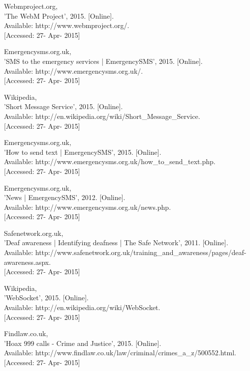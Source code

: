 \documentclass[]{article}
\begin{document}
\begin{enumerate}[label={[\arabic*]}]
\item  Webmproject.org, \\{}'The WebM Project', 2015. [Online]. \\{}Available: http://www.webmproject.org/.\\{} [Accessed: 27- Apr- 2015]

\item  Emergencysms.org.uk, \\{}'SMS to the emergency services | EmergencySMS', 2015. [Online].\\{} Available: http://www.emergencysms.org.uk/. \\{}[Accessed: 27- Apr- 2015]

\item  Wikipedia, \\{}'Short Message Service', 2015. [Online]. \\{}Available: http://en.wikipedia.org/wiki/Short\_Message\_Service. \\{}[Accessed: 27- Apr- 2015]

\item  Emergencysms.org.uk, \\{}'How to send text | EmergencySMS', 2015. [Online].\\{} Available: http://www.emergencysms.org.uk/how\_to\_send\_text.php. \\{}[Accessed: 27- Apr- 2015]

\item  Emergencysms.org.uk, \\{}'News | EmergencySMS', 2012. [Online].\\{} Available: http://www.emergencysms.org.uk/news.php. \\{}[Accessed: 27- Apr- 2015]

\item  Safenetwork.org.uk, \\{}'Deaf awareness | Identifying deafness | The Safe Network', 2011. [Online].\\{} Available: http://www.safenetwork.org.uk/training\_and\_awareness/pages/deaf-awareness.aspx. \\{}[Accessed: 27- Apr- 2015]

\item  Wikipedia,\\{} 'WebSocket', 2015. [Online].\\{} Available: http://en.wikipedia.org/wiki/WebSocket.\\{} [Accessed: 27- Apr- 2015]

\item  Findlaw.co.uk, \\{}'Hoax 999 calls - Crime and Justice', 2015. [Online].\\{} Available: http://www.findlaw.co.uk/law/criminal/crimes\_a\_z/500552.html.\\{} [Accessed: 27- Apr- 2015]


\end{enumerate}
\end{document}
